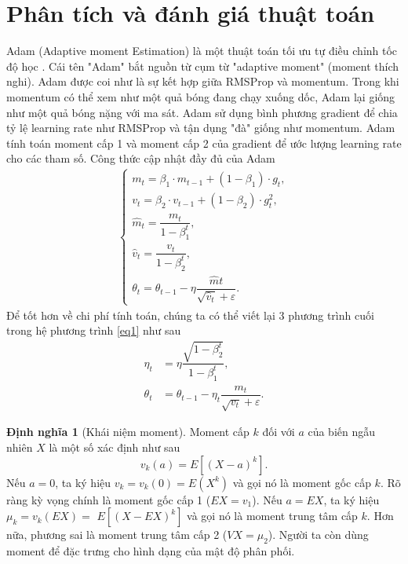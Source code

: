 \documentclass[11pt,oneside,a4paper]{report}
\theoremstyle{definition}
\newtheorem{dn}{Định nghĩa}[section]
\begin{document}
\section{Phân tích và đánh giá thuật toán}
Adam (Adaptive moment Estimation) là một thuật toán tối ưu tự điều chỉnh tốc độ học \cite{7}. Cái tên "Adam" bắt nguồn từ cụm từ "adaptive moment" (moment thích nghi). Adam được coi như là sự kết hợp giữa RMSProp và momentum. Trong khi momentum có thể xem như một quả bóng đang chạy xuống dốc, Adam lại giống như một quả bóng nặng với ma sát. Adam sử dụng bình phương gradient để chia tỷ lệ learning rate như RMSProp và tận dụng "đà" giống như momentum. Adam tính toán moment cấp 1 và moment cấp 2 của gradient để ước lượng learning rate cho các tham số. Công thức cập nhật đầy đủ của Adam
\begin{align}
\begin{cases}
m_t= \beta_1 \cdot m_{t-1}+\left(1-\beta_1\right) \cdot g_t,\\
v_t= \beta_2 \cdot v_{t-1}+\left(1-\beta_2\right) \cdot g_t^2,\\
\hat{m}_t=\dfrac{m_t}{1-\beta_1^t} ,\\
\hat{v}_t=\dfrac{v_t}{1-\beta_2^t} ,\\
\theta_t=\theta_{t-1}-\eta \dfrac{\hat{m}t}{\sqrt{\hat{v}_t}+\varepsilon}.
\label{eq1}
\end{cases}
\end{align}
Để tốt hơn về chi phí tính toán,  chúng ta có thể viết lại 3 phương trình cuối trong hệ phương trình \ref{eq1} như sau 
\begin{align}
\eta_t&=\eta \dfrac{\sqrt{1-\beta_2^t}}{1-\beta_1^t}, \\
\theta_t&=\theta_{t-1}-\eta_t \dfrac{m_t}{\sqrt{v_t}+\varepsilon}.
\end{align}

\begin{dn}[Khái niệm moment]
Moment cấp $k$ đối với $a$ của biến ngẫu nhiên $X$ là một số xác định như sau
$$
v_k(a)=E\left[(X-a)^k\right].
$$
Nếu $a=0$, ta ký hiệu $v_k=v_k(0)=E\left(X^k\right)$ và gọi nó là moment gốc cấp $k$. Rõ ràng kỳ vọng chính là moment gốc cấp 1 ($E X=v_1$). Nếu $a=E X$, ta ký hiệu $\mu_k=v_k(E X)=$ $E\left[(X-E X)^k\right]$ và gọi nó là moment trung tâm cấp $k$. Hơn nữa, phương sai là moment trung tâm cấp 2 ($V X=\mu_2$). Người ta còn dùng moment để đặc trưng cho hình dạng của mật độ phân phối.
\end{dn}
\end{document}
